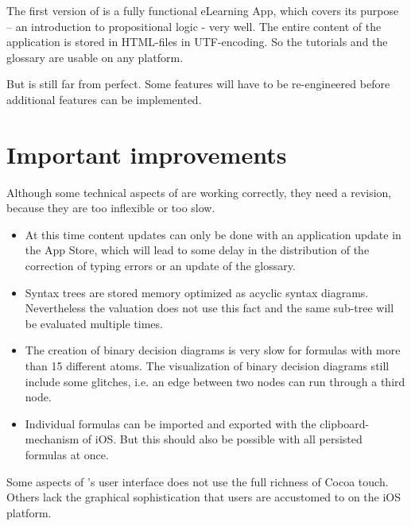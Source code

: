 
The first version of \Nyaya is a fully functional eLearning App, 
which covers its purpose – an introduction to propositional logic - very well.
The entire content of the application is stored in HTML-files in UTF-encoding.
So the tutorials and the glossary are usable on any platform.

But \Nyaya is still far from perfect.
Some features will have to be re-engineered before additional features can be implemented.



\section{Important improvements}

Although some technical aspects of \Nyaya are working correctly, they need a revision, 
because they are too inflexible or too slow.

\begin{itemize}

\item At this time content updates can only be done with an application update in the App Store,
which will lead to some delay in the distribution of the correction of typing errors or an update of the glossary.

\item Syntax trees are stored memory optimized as acyclic syntax diagrams. 
Nevertheless the valuation does not use this fact and the same sub-tree will be evaluated multiple times.

\item The creation of binary decision diagrams is very slow for formulas with more than 15 different atoms.
The visualization of binary decision diagrams still include some glitches, 
i.e. an edge between two nodes can run through a third node.

\item Individual formulas can be imported and exported with the clipboard-mechanism of iOS. 
But this should also be possible with all persisted formulas at once. 

\end{itemize}

Some aspects of \Nyaya’s user interface does not use the full richness of Cocoa touch. 
Others lack the graphical sophistication that users are accustomed to on the iOS platform.

